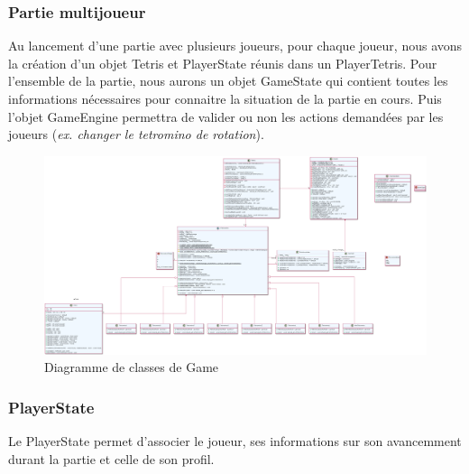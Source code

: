 \documentclass{article}
\begin{document}
\subsubsection{Partie multijoueur}

Au lancement d'une partie avec plusieurs joueurs, pour chaque joueur, nous avons la création d'un objet Tetris et PlayerState réunis dans un PlayerTetris. Pour l'ensemble de la partie, nous aurons un objet GameState qui contient toutes les informations nécessaires pour connaitre la situation de la partie en cours. Puis l'objet GameEngine permettra de valider ou non les actions demandées par les joueurs (\textit{ex. changer le tetromino de rotation}).

\newpage

\begin{figure}[H]
	\centering
	 \includegraphics[scale=0.2, angle=90]{../res/uml/class/GameClass.png}
	 \caption{Diagramme de classes de Game}
	 \label{fig:GameClassDiagram}
\end{figure}


\subsubsection*{PlayerState}

Le PlayerState permet d'associer le joueur, ses informations sur son avancemment durant la partie et celle de son profil.
\end{document}
